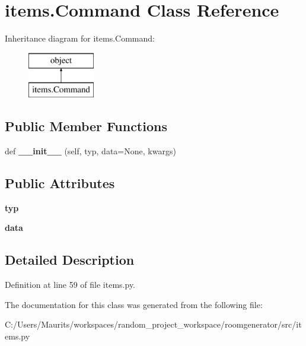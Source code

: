 \hypertarget{classitems_1_1_command}{}\section{items.\+Command Class Reference}
\label{classitems_1_1_command}
Inheritance diagram for items.\+Command\+:\begin{figure}[H]
\begin{center}
\leavevmode
\includegraphics[height=2.000000cm]{classitems_1_1_command}
\end{center}
\end{figure}
\subsection*{Public Member Functions}
\begin{DoxyCompactItemize}
\item 
\hypertarget{classitems_1_1_command_a6eeb22e8d48035c196d41bca7dcc9e26}{}def {\bfseries \+\_\+\+\_\+init\+\_\+\+\_\+} (self, typ, data=None, kwargs)\label{classitems_1_1_command_a6eeb22e8d48035c196d41bca7dcc9e26}

\end{DoxyCompactItemize}
\subsection*{Public Attributes}
\begin{DoxyCompactItemize}
\item 
\hypertarget{classitems_1_1_command_a653987d5c7486f9717c367f9ea32a531}{}{\bfseries typ}\label{classitems_1_1_command_a653987d5c7486f9717c367f9ea32a531}

\item 
\hypertarget{classitems_1_1_command_ae32c004e02e093045ba9efd912a461fa}{}{\bfseries data}\label{classitems_1_1_command_ae32c004e02e093045ba9efd912a461fa}

\end{DoxyCompactItemize}


\subsection{Detailed Description}


Definition at line 59 of file items.\+py.



The documentation for this class was generated from the following file\+:\begin{DoxyCompactItemize}
\item 
C\+:/\+Users/\+Maurits/workspaces/random\+\_\+project\+\_\+workspace/roomgenerator/src/items.\+py\end{DoxyCompactItemize}
